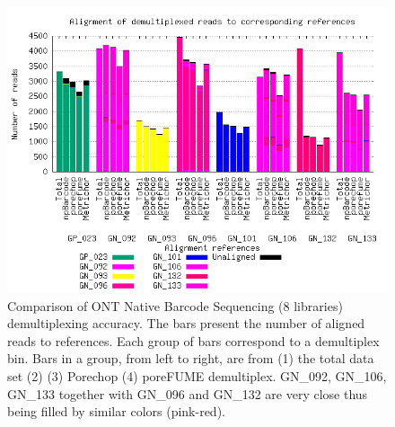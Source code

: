 \begin{figure}[!hpt]
\includegraphics[width=\textwidth]{images/alignment.png}
\caption[Comparison of ONT Native Barcode Sequencing demultiplexing accuracy]
{Comparison of ONT Native Barcode Sequencing (8 libraries) demultiplexing accuracy. The bars present the number of aligned reads to references. Each group of bars correspond to a demultiplex bin. Bars in a group, from left to right, are from (1) the total data set (2) \npbarcode{} (3) Porechop (4) poreFUME demultiplex. GN\_092, GN\_106, GN\_133 together with GN\_096 and GN\_132 are very close thus being filled by similar colors (pink-red).}
\label{supp_fig:comparison}
\end{figure}


